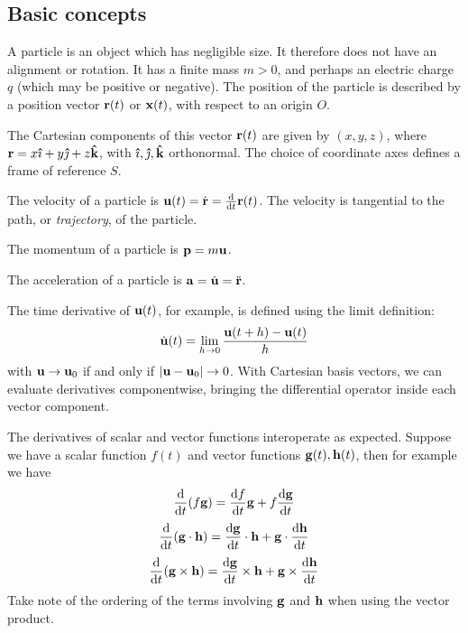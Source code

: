 \subsection{Basic concepts}
\begin{definition}
	A particle is an object which has negligible size.
	It therefore does not have an alignment or rotation.
	It has a finite mass \(m > 0\), and perhaps an electric charge \(q\) (which may be positive or negative).
	The position of the particle is described by a position vector \(\vb r(t)\) or \(\vb x(t)\), with respect to an origin \(O\).
\end{definition}
\begin{definition}
	The Cartesian components of this vector \(\vb r(t)\) are given by \((x, y, z)\), where \(\vb r = x \vu{\imath} + y \vu{\jmath} + z \vu{k}\), with \(\vu{\imath}, \vu{\jmath}, \vu{k}\) orthonormal.
	The choice of coordinate axes defines a frame of reference \(S\).
\end{definition}
\begin{definition}
	The velocity of a particle is \(\vb u(t) = \dot{\vb r} = \frac{\dd}{\dd{t}}\vb r(t)\).
	The velocity is tangential to the path, or \textit{trajectory}, of the particle.
\end{definition}
\begin{definition}
	The momentum of a particle is \(\vb p = m \vb u\).
\end{definition}
\begin{definition}
	The acceleration of a particle is \(\vb a = \dot{\vb u} = \ddot{\vb r}\).
\end{definition}
\begin{note}
	The time derivative of \(\vb u(t)\), for example, is defined using the limit definition:
	\[
		\dot{\vb u}(t) = \lim_{h \to 0} \frac{\vb u(t + h) - \vb u(t)}{h}
	\]
	with \(\vb u \to \vb u_0\) if and only if \(\abs{\vb u - \vb u_0} \to 0\).
	With Cartesian basis vectors, we can evaluate derivatives componentwise, bringing the differential operator inside each vector component.
\end{note}
The derivatives of scalar and vector functions interoperate as expected.
Suppose we have a scalar function \(f(t)\) and vector functions \(\vb g(t), \vb h(t)\), then for example we have
\[
	\frac{\dd}{\dd{t}}(f \vb g) = \frac{\dd{f}}{\dd{t}} \vb g + f \frac{\dd \vb g}{\dd{t}}
\]
\[
	\frac{\dd}{\dd{t}}(\vb g \cdot \vb h) = \frac{\dd \vb g}{\dd{t}}\cdot \vb h + \vb g \cdot \frac{\dd \vb h}{\dd{t}}
\]
\[
	\frac{\dd}{\dd{t}}(\vb g \times \vb h) = \frac{\dd \vb g}{\dd{t}}\times \vb h + \vb g \times \frac{\dd \vb h}{\dd{t}}
\]
Take note of the ordering of the terms involving \(\vb g\) and \(\vb h\) when using the vector product.


